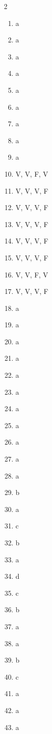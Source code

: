 \documentclass[12pt,a4paper]{article}
\begin{document}
\begin{multicols}{2}
\begin{enumerate}[label=\textbf{Q\arabic*.}]
    \item a
    \item a
    \item a
    \item a
    \item a
    \item a
    \item a
    \item a
    \item a
    \item V, V, F, V
    \item V, V, V, F
    \item V, V, V, F
    \item V, V, V, F
    \item V, V, V, F
    \item V, V, V, F
    \item V, V, F, V
    \item V, V, V, F
    \item a
    \item a
    \item a
    \item a
    \item a
    \item a
    \item a
    \item a
    \item a
    \item a
    \item a
    \item b
    \item a
    \item c
    \item b
    \item a
    \item d
    \item c
    \item b
    \item a
    \item a
    \item b
    \item c
    \item a
    \item a
    \item a
\end{enumerate}
\end{multicols}
\end{document}
